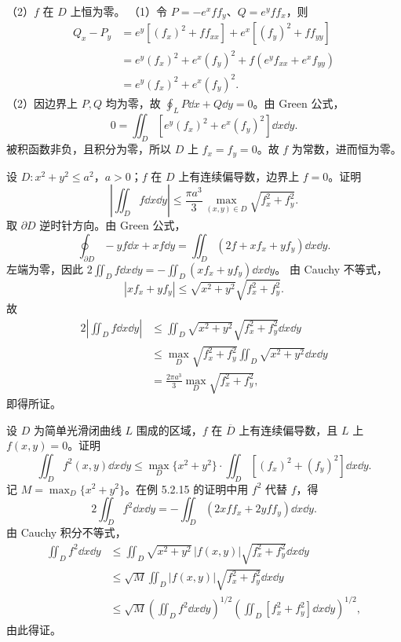 （2）$f$ 在 $D$ 上恒为零。
\prooftext （1）令 $P=-e^xff_y$、$Q=e^yff_x$，则
\begin{align*}
Q_x-P_y&=e^y[(f_x)^2+ff_{xx}]+e^x[(f_y)^2+ff_{yy}]\\
&=e^y(f_x)^2+e^x(f_y)^2+f(e^yf_{xx}+e^xf_{yy})\\
&=e^y(f_x)^2+e^x(f_y)^2.
\end{align*}
（2）因边界上 $P,Q$ 均为零，故 $\oint_LP\dd x+Q\dd y=0$。由 Green 公式，
\[
0=\iint_D[e^y(f_x)^2+e^x(f_y)^2]\dd x\dd y.
\]
被积函数非负，且积分为零，所以 $D$ 上 $f_x=f_y=0$。故 $f$ 为常数，进而恒为零。

设 $D:x^2+y^2\le a^2$，$a>0$；$f$ 在 $D$ 上有连续偏导数，边界上 $f=0$。证明
\[
\left|\iint_Df\dd x\dd y\right|\le\frac{\pi a^3}{3}\max_{(x,y)\in D}\sqrt{f_x^2+f_y^2}.
\]
\prooftext 取 $\partial D$ 逆时针方向。由 Green 公式，
\[
\oint_{\partial D}-yf\dd x+xf\dd y=\iint_D(2f+xf_x+yf_y)\dd x\dd y.
\]
左端为零，因此 $2\iint_Df\dd x\dd y=-\iint_D(xf_x+yf_y)\dd x\dd y$。
由 Cauchy 不等式，
\[
|xf_x+yf_y|\le\sqrt{x^2+y^2}\sqrt{f_x^2+f_y^2}.
\]
故
\begin{align*}
2\left|\iint_Df\dd x\dd y\right|
&\le\iint_D\sqrt{x^2+y^2}\sqrt{f_x^2+f_y^2}\dd x\dd y\\
&\le\max_D\sqrt{f_x^2+f_y^2}\iint_D\sqrt{x^2+y^2}\dd x\dd y\\
&=\frac{2\pi a^3}{3}\max_D\sqrt{f_x^2+f_y^2},
\end{align*}
即得所证。

设 $D$ 为简单光滑闭曲线 $L$ 围成的区域，$f$ 在 $\overline D$ 上有连续偏导数，且 $L$ 上 $f(x,y)=0$。证明
\[
\iint_Df^2(x,y)\dd x\dd y\le\max_D\{x^2+y^2\}\cdot\iint_D[(f_x)^2+(f_y)^2]\dd x\dd y.
\]
\prooftext 记 $M=\max_D\{x^2+y^2\}$。在例 5.2.15 的证明中用 $f^2$ 代替 $f$，得
\[
2\iint_Df^2\dd x\dd y=-\iint_D(2xff_x+2yff_y)\dd x\dd y.
\]
由 Cauchy 积分不等式，
\begin{align*}
\iint_Df^2\dd x\dd y
&\le\iint_D\sqrt{x^2+y^2}\,|f(x,y)|\sqrt{f_x^2+f_y^2}\dd x\dd y\\
&\le\sqrt M\iint_D|f(x,y)|\sqrt{f_x^2+f_y^2}\dd x\dd y\\
&\le\sqrt M\left(\iint_Df^2\dd x\dd y\right)^{1/2}
\left(\iint_D[f_x^2+f_y^2]\dd x\dd y\right)^{1/2},
\end{align*}
由此得证。
